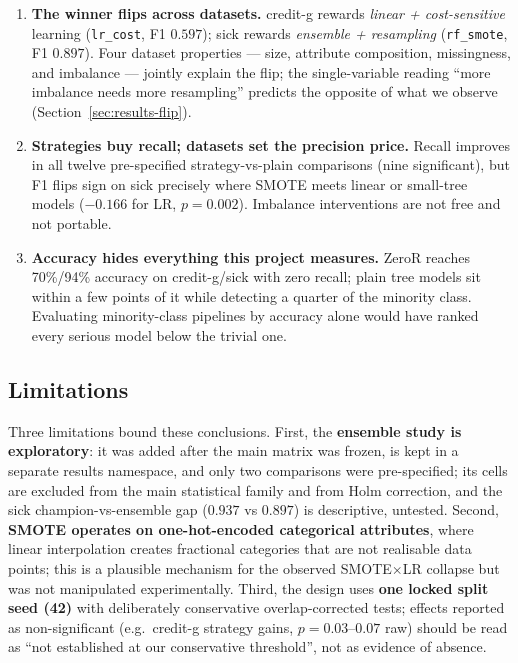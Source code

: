 \begin{enumerate}
  \item \textbf{The winner flips across datasets.} credit-g rewards \emph{linear + cost-sensitive} learning (\texttt{lr\_cost}, F1 $0.597$); sick rewards \emph{ensemble + resampling} (\texttt{rf\_smote}, F1 $0.897$). Four dataset properties --- size, attribute composition, missingness, and imbalance --- jointly explain the flip; the single-variable reading ``more imbalance needs more resampling'' predicts the opposite of what we observe (Section~\ref{sec:results-flip}).
  \item \textbf{Strategies buy recall; datasets set the precision price.} Recall improves in all twelve pre-specified strategy-vs-plain comparisons (nine significant), but F1 flips sign on sick precisely where SMOTE meets linear or small-tree models ($-0.166$ for LR, $p=0.002$). Imbalance interventions are not free and not portable.
  \item \textbf{Accuracy hides everything this project measures.} ZeroR reaches 70\%/94\% accuracy on credit-g/sick with zero recall; plain tree models sit within a few points of it while detecting a quarter of the minority class. Evaluating minority-class pipelines by accuracy alone would have ranked every serious model below the trivial one.
\end{enumerate}

\subsection{Limitations}

Three limitations bound these conclusions. First, the \textbf{ensemble study is exploratory}: it was added after the main matrix was frozen, is kept in a separate results namespace, and only two comparisons were pre-specified; its cells are excluded from the main statistical family and from Holm correction, and the sick champion-vs-ensemble gap ($0.937$ vs $0.897$) is descriptive, untested. Second, \textbf{SMOTE operates on one-hot-encoded categorical attributes}, where linear interpolation creates fractional categories that are not realisable data points; this is a plausible mechanism for the observed SMOTE$\times$LR collapse but was not manipulated experimentally. Third, the design uses \textbf{one locked split seed (42)} with deliberately conservative overlap-corrected tests; effects reported as non-significant (e.g.\ credit-g strategy gains, $p=0.03$--$0.07$ raw) should be read as ``not established at our conservative threshold'', not as evidence of absence.

